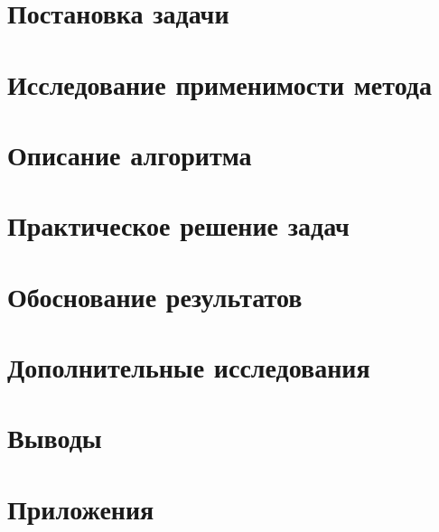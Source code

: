\documentclass[main.tex]{subfiles}
\begin{document}
\section{Постановка задачи}

\section{Исследование применимости метода}

\section{Описание алгоритма}

\section{Практическое решение задач}

\newpage
\section{Обоснование результатов}

\newpage
\section{Дополнительные исследования}

\newpage
\section{Выводы}

\section{Приложения}

\end{document}
